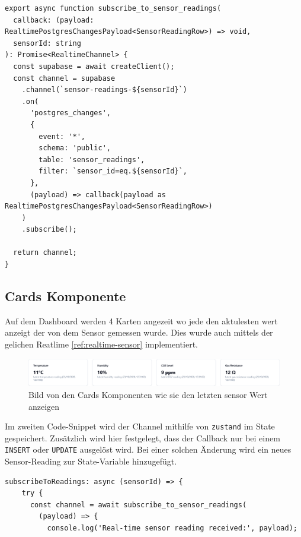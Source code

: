 \begin{inhalt}
\begin{enumerate}[label=\textbf{\arabic*.}]
\begin{lstlisting}[language=mytsx]
export async function subscribe_to_sensor_readings(
  callback: (payload: RealtimePostgresChangesPayload<SensorReadingRow>) => void,
  sensorId: string
): Promise<RealtimeChannel> {
  const supabase = await createClient();
  const channel = supabase
    .channel(`sensor-readings-${sensorId}`)
    .on(
      'postgres_changes',
      {
        event: '*',
        schema: 'public',
        table: 'sensor_readings',
        filter: `sensor_id=eq.${sensorId}`,
      },
      (payload) => callback(payload as RealtimePostgresChangesPayload<SensorReadingRow>)
    )
    .subscribe();
  
  return channel;
}
\end{lstlisting}

\newpage

\subsection{Cards Komponente}

Auf dem Dashboard werden 4 Karten angezeit wo jede den aktulesten wert anzeigt der von dem Sensor gemessen wurde. Dies wurde auch mittels der gelichen Reatlime \ref{ref:realtime-sensor} implementiert.


\begin{figure}[!htb]
\centering
\includegraphics[width=1\textwidth]{files/Thomas/pics/Website/dashbord/dashboard-card.png}
\caption[Bild von den Cards Komponenten wie sie den letzten sensor Wert anzeigen]{Bild von den Cards Komponenten wie sie den letzten sensor Wert anzeigen}
\label{fig:gehaeuse_internet_bild}
\end{figure}


Im zweiten Code-Snippet wird der Channel mithilfe von \texttt{zustand} im State gespeichert.  
Zusätzlich wird hier festgelegt, dass der Callback nur bei einem \texttt{INSERT} oder \texttt{UPDATE} ausgelöst wird.  
Bei einer solchen Änderung wird ein neues Sensor-Reading zur State-Variable hinzugefügt.

\begin{lstlisting}[language=mytsx]
subscribeToReadings: async (sensorId) => {
    try {
      const channel = await subscribe_to_sensor_readings(
        (payload) => {
          console.log('Real-time sensor reading received:', payload);
          

\end{lstlisting}
\end{enumerate}
\end{inhalt}
